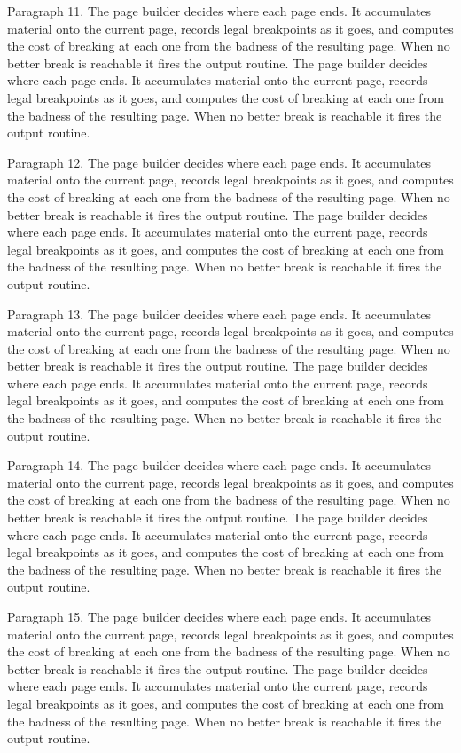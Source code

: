 Paragraph 11. The page builder decides where each page ends. It accumulates material onto the current page, records legal breakpoints as it goes, and computes the cost of breaking at each one from the badness of the resulting page. When no better break is reachable it fires the output routine. The page builder decides where each page ends. It accumulates material onto the current page, records legal breakpoints as it goes, and computes the cost of breaking at each one from the badness of the resulting page. When no better break is reachable it fires the output routine. 

Paragraph 12. The page builder decides where each page ends. It accumulates material onto the current page, records legal breakpoints as it goes, and computes the cost of breaking at each one from the badness of the resulting page. When no better break is reachable it fires the output routine. The page builder decides where each page ends. It accumulates material onto the current page, records legal breakpoints as it goes, and computes the cost of breaking at each one from the badness of the resulting page. When no better break is reachable it fires the output routine. 

Paragraph 13. The page builder decides where each page ends. It accumulates material onto the current page, records legal breakpoints as it goes, and computes the cost of breaking at each one from the badness of the resulting page. When no better break is reachable it fires the output routine. The page builder decides where each page ends. It accumulates material onto the current page, records legal breakpoints as it goes, and computes the cost of breaking at each one from the badness of the resulting page. When no better break is reachable it fires the output routine. 

Paragraph 14. The page builder decides where each page ends. It accumulates material onto the current page, records legal breakpoints as it goes, and computes the cost of breaking at each one from the badness of the resulting page. When no better break is reachable it fires the output routine. The page builder decides where each page ends. It accumulates material onto the current page, records legal breakpoints as it goes, and computes the cost of breaking at each one from the badness of the resulting page. When no better break is reachable it fires the output routine. 

Paragraph 15. The page builder decides where each page ends. It accumulates material onto the current page, records legal breakpoints as it goes, and computes the cost of breaking at each one from the badness of the resulting page. When no better break is reachable it fires the output routine. The page builder decides where each page ends. It accumulates material onto the current page, records legal breakpoints as it goes, and computes the cost of breaking at each one from the badness of the resulting page. When no better break is reachable it fires the output routine. 

